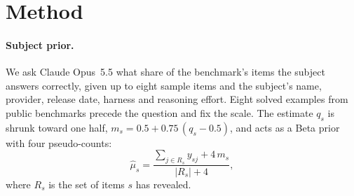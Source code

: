 \documentclass{article}
\begin{document}
\section{Method}
\label{sec:method}

\paragraph{Subject prior.} We ask Claude Opus~5.5 what share of the benchmark's items the subject answers correctly, given up to eight sample items and the subject's name, provider, release date, harness and reasoning effort. Eight solved examples from public benchmarks precede the question and fix the scale. The estimate $q_s$ is shrunk toward one half, $m_s = 0.5 + 0.75\,(q_s - 0.5)$, and acts as a Beta prior with four pseudo-counts:
\begin{equation}
\hat\mu_s = \frac{\sum_{j \in R_s} y_{sj} + 4\, m_s}{|R_s| + 4},
\end{equation}
where $R_s$ is the set of items $s$ has revealed.
\end{document}
